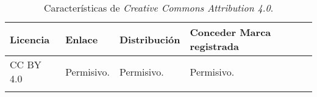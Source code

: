 \begin{longtable}[]{@{}llll@{}} 
\toprule 
\begin{minipage}[b]{0.15\columnwidth}\raggedright\strut
Licencia\strut
\end{minipage} & \begin{minipage}[b]{0.15\columnwidth}\raggedright\strut
Enlace\strut
\end{minipage} & \begin{minipage}[b]{0.20\columnwidth}\raggedright\strut
Distribución\strut
\end{minipage} & \begin{minipage}[b]{0.36\columnwidth}\raggedright\strut
Conceder Marca registrada\strut
\end{minipage}\tabularnewline
\midrule
\endhead
\begin{minipage}[t]{0.15\columnwidth}\raggedright\strut
CC BY 4.0\strut
\end{minipage} & \begin{minipage}[t]{0.15\columnwidth}\raggedright\strut
Permisivo.\strut
\end{minipage} & \begin{minipage}[t]{0.20\columnwidth}\raggedright\strut
Permisivo.\strut
\end{minipage} & \begin{minipage}[t]{0.36\columnwidth}\raggedright\strut
Permisivo.\strut
\end{minipage}\tabularnewline
\bottomrule
\caption{Características de \textit{Creative Commons Attribution 4.0}.}
\label{tab:ccaresumetable}
\end{longtable}

